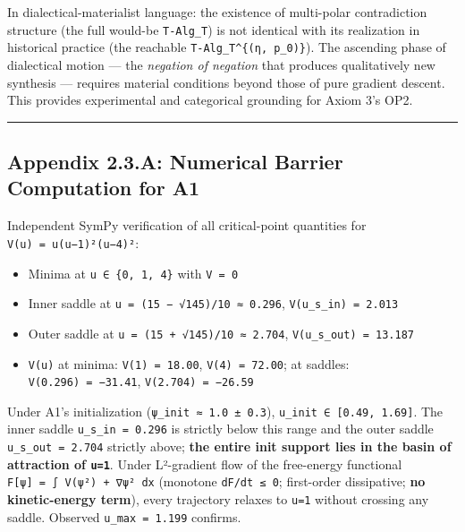 \documentclass[
]{article}
\providecommand{\tightlist}{%
  \setlength{\itemsep}{0pt}\setlength{\parskip}{0pt}}
\begin{document}
In dialectical-materialist language: the existence of multi-polar
contradiction structure (the full would-be \texttt{T-Alg\_T}) is not
identical with its realization in historical practice (the reachable
\texttt{T-Alg\_T\^{}\{(η,\ p\_0)\}}). The ascending phase of dialectical
motion --- the \emph{negation of negation} that produces qualitatively
new synthesis --- requires material conditions beyond those of pure
gradient descent. This provides experimental and categorical grounding
for Axiom 3's OP2.

\begin{center}\rule{0.5\linewidth}{0.5pt}\end{center}

\hypertarget{appendix-2.3.a-numerical-barrier-computation-for-a1}{%
\subsection{Appendix 2.3.A: Numerical Barrier Computation for
A1}\label{appendix-2.3.a-numerical-barrier-computation-for-a1}}

Independent SymPy verification of all critical-point quantities for
\texttt{V(u)\ =\ u(u−1)²(u−4)²}:

\begin{itemize}
\tightlist
\item
  Minima at \texttt{u\ ∈\ \{0,\ 1,\ 4\}} with \texttt{V\ =\ 0}
\item
  Inner saddle at \texttt{u\ =\ (15\ −\ √145)/10\ ≈\ 0.296},
  \texttt{V(u\_s\_in)\ =\ 2.013}
\item
  Outer saddle at \texttt{u\ =\ (15\ +\ √145)/10\ ≈\ 2.704},
  \texttt{V(u\_s\_out)\ =\ 13.187}
\item
  \texttt{V\textquotesingle{}\textquotesingle{}(u)} at minima:
  \texttt{V\textquotesingle{}\textquotesingle{}(1)\ =\ 18.00},
  \texttt{V\textquotesingle{}\textquotesingle{}(4)\ =\ 72.00}; at
  saddles:
  \texttt{V\textquotesingle{}\textquotesingle{}(0.296)\ =\ −31.41},
  \texttt{V\textquotesingle{}\textquotesingle{}(2.704)\ =\ −26.59}
\end{itemize}

Under A1's initialization
(\texttt{\textbar{}ψ\textbar{}\_init\ ≈\ 1.0\ ±\ 0.3}),
\texttt{u\_init\ ∈\ {[}0.49,\ 1.69{]}}. The inner saddle
\texttt{u\_s\_in\ =\ 0.296} is strictly below this range and the outer
saddle \texttt{u\_s\_out\ =\ 2.704} strictly above; \textbf{the entire
init support lies in the basin of attraction of \texttt{u=1}}. Under
L²-gradient flow of the free-energy functional
\texttt{F{[}ψ{]}\ =\ ∫\ V(\textbar{}ψ\textbar{}²)\ +\ \textbar{}∇ψ\textbar{}²\ dx}
(monotone \texttt{dF/dt\ ≤\ 0}; first-order dissipative; \textbf{no
kinetic-energy term}), every trajectory relaxes to \texttt{u=1} without
crossing any saddle. Observed \texttt{u\_max\ =\ 1.199} confirms.
\end{document}
